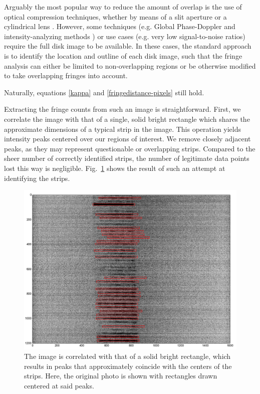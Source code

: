 \documentclass[11.5pt,oneside]{book}
\newcommand*{\figref}[1]{Fig.~\ref{#1}}
\begin{document}
Arguably the most popular way to reduce the amount of overlap is the use of
optical compression techniques, whether by means of a slit aperture \cite{Pan06}
or a cylindrical lens \cite{Kawaguchi02, Maeda02}. However, some techniques
(e.g. Global Phase-Doppler \cite{Damaschke01} and intensity-analyzing
methods \cite{Querel10}) or use cases (e.g. very low signal-to-noise ratios)
require the full disk image to be available. In these cases, the standard
approach is to identify the location and outline of each disk image, such that
the fringe analysis can either be limited to non-overlapping regions or be
otherwise modified to take overlapping fringes into account.

Naturally, equations \eqref{kappa} and \eqref{fringedistance-pixels} still hold.

Extracting the fringe counts from such an image is straightforward. First, we
correlate the image with that of a single, solid bright rectangle which shares
the approximate dimensions of a typical strip in the image. This operation
yields intensity
peaks centered over our regions of interest. We remove closely adjacent peaks,
as they may represent questionable or overlapping strips. Compared to the sheer
number of correctly identified strips, the number of legitimate data points lost
this way is negligible. \figref{fig:globalsizing-identifystrips} shows the
result of such an attempt at identifying the strips.

\begin{figure}[h]
    \centering
    \includegraphics[height=0.38\textheight]{img/globalsizing-identifystrips.png}
    \caption{The image is correlated with that of a solid bright rectangle, which
        results in peaks that approximately coincide with the centers of the
        strips. Here, the original photo is shown with rectangles drawn centered
    at said peaks.}
    \label{fig:globalsizing-identifystrips}
\end{figure}
\end{document}
